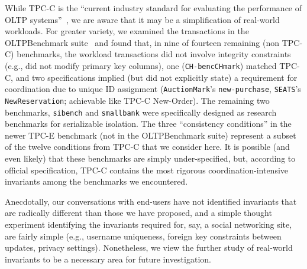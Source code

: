  While TPC-C is the ``current
industry standard for evaluating the performance of OLTP
systems''~\cite{oltpbench}, we are aware that it may be a
simplification of real-world workloads. For greater variety, we
examined the transactions in the OLTPBenchmark suite~\cite{oltpbench}
and found that, in nine of fourteen remaining (non TPC-C) benchmarks,
the workload transactions did not involve integrity constraints (e.g.,
did not modify primary key columns), one (\texttt{CH-bencCHmark})
matched TPC-C, and two specifications implied (but did not explicitly
state) a requirement for coordination due to unique ID assignment
(\texttt{AuctionMark}'s \texttt{new-purchase}, \texttt{SEATS}'s
\texttt{NewReservation}; achievable like TPC-C New-Order). The
remaining two benchmarks, \texttt{sibench} and \texttt{smallbank} were
specifically designed as research benchmarks for serializable
isolation. The three ``consistency conditions'' in the newer TPC-E
benchmark (not in the OLTPBenchmark suite) represent a subset of the twelve
conditions from TPC-C that we consider here. It is possible (and even
likely) that these benchmarks are simply under-specified, but,
according to official specification, TPC-C contains the most rigorous
coordination-intensive invariants among the benchmarks we encountered.

Anecdotally, our conversations with end-users have not identified
invariants that are radically different than those we have proposed,
and a simple thought experiment identifying the invariants required
for, say, a social networking site, are fairly simple (e.g., username
uniqueness, foreign key constraints between updates, privacy
settings). Nonetheless, we view the further study of real-world
invariants to be a necessary area for future investigation.


